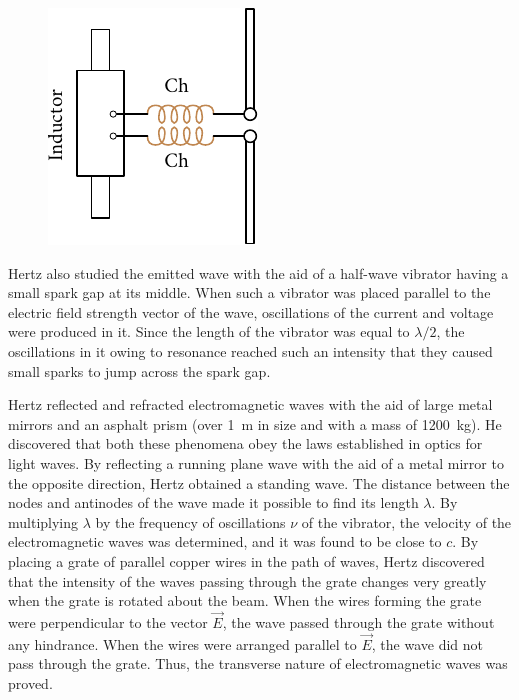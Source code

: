 \begin{figure}[t]
	\begin{center}
		\includegraphics[scale=1]{figures/ch_15/fig_15_2.pdf}
		\caption[]{}
		\label{fig:15_2}
	\end{center}
	\vspace{-0.8cm}
\end{figure}

Hertz also studied the emitted wave with the aid of a half-wave vibrator having a small spark gap at its middle.
When such a vibrator was placed parallel to the electric field strength vector of the wave, oscillations of the current and voltage were produced in it.
Since the length of the vibrator was equal to $\lambda/2$, the oscillations in it owing to resonance reached such an intensity that they caused small sparks to jump across the spark gap.

Hertz reflected and refracted electromagnetic waves with the aid of large metal mirrors and an asphalt prism (over \SI{1}{\metre} in size and with a mass of \SI{1200}{\kilo\gram}).
He discovered that both these phenomena obey the laws established in optics for light waves.
By reflecting a running plane wave with the aid of a metal mirror to the opposite direction, Hertz obtained a standing wave.
The distance between the nodes and antinodes of the wave made it possible to find its length $\lambda$.
By multiplying $\lambda$ by the frequency of oscillations $\nu$ of the vibrator, the velocity of the electromagnetic waves was determined, and it was found to be close to $c$.
By placing a grate of parallel copper wires in the path of waves, Hertz discovered that the intensity of the waves passing through the grate changes very greatly when the grate is rotated about the beam. When the wires forming the grate were perpendicular to the vector $\vec{E}$, the wave passed through the grate without any hindrance.
When the wires were arranged parallel to $\vec{E}$, the wave did not pass through the grate.
Thus, the transverse nature of electromagnetic waves was proved.

